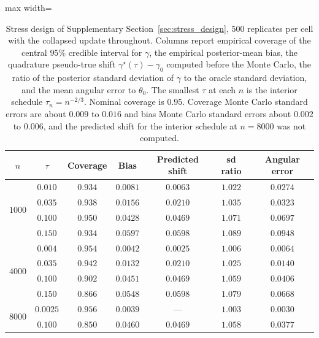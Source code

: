 \documentclass[11pt]{article}
\theoremstyle{definition}
\theoremstyle{plain}
\begin{document}
\begin{table}[!htbp]
  \centering
  \caption{Stress design of Supplementary Section~\ref{sec:stress_design}, $500$ replicates per cell with the collapsed update throughout. Columns report empirical coverage of the central $95\%$ credible interval for $\gamma$, the empirical posterior-mean bias, the quadrature pseudo-true shift $\gamma^\star(\tau)-\gamma_0$ computed before the Monte Carlo, the ratio of the posterior standard deviation of $\gamma$ to the oracle standard deviation, and the mean angular error to $\theta_0$. The smallest $\tau$ at each $n$ is the interior schedule $\tau_n=n^{-2/3}$. Nominal coverage is $0.95$. Coverage Monte Carlo standard errors are about $0.009$ to $0.016$ and bias Monte Carlo standard errors about $0.002$ to $0.006$, and the predicted shift for the interior schedule at $n=8000$ was not computed.}
  \label{tab:sim_stress}
  \begin{adjustbox}{max width=\textwidth}
  \begin{tabular}{c c ccccc}
    \toprule
    $n$ & $\tau$ & Coverage & Bias & Predicted shift & sd ratio & Angular error\\
    \midrule
    \multirow{4}{*}{$1000$}
      & $0.010$ & $0.934$ & $0.0081$ & $0.0063$ & $1.022$ & $0.0274$\\
      & $0.035$ & $0.938$ & $0.0156$ & $0.0210$ & $1.035$ & $0.0323$\\
      & $0.100$ & $0.950$ & $0.0428$ & $0.0469$ & $1.071$ & $0.0697$\\
      & $0.150$ & $0.934$ & $0.0597$ & $0.0598$ & $1.089$ & $0.0948$\\
    \midrule
    \multirow{4}{*}{$4000$}
      & $0.004$ & $0.954$ & $0.0042$ & $0.0025$ & $1.006$ & $0.0064$\\
      & $0.035$ & $0.942$ & $0.0132$ & $0.0210$ & $1.025$ & $0.0140$\\
      & $0.100$ & $0.902$ & $0.0451$ & $0.0469$ & $1.059$ & $0.0406$\\
      & $0.150$ & $0.866$ & $0.0548$ & $0.0598$ & $1.079$ & $0.0668$\\
    \midrule
    \multirow{2}{*}{$8000$}
      & $0.0025$ & $0.956$ & $0.0039$ & ---      & $1.003$ & $0.0030$\\
      & $0.100$  & $0.850$ & $0.0460$ & $0.0469$ & $1.058$ & $0.0377$\\
    \bottomrule
  \end{tabular}
  \end{adjustbox}
\end{table}
\end{document}

